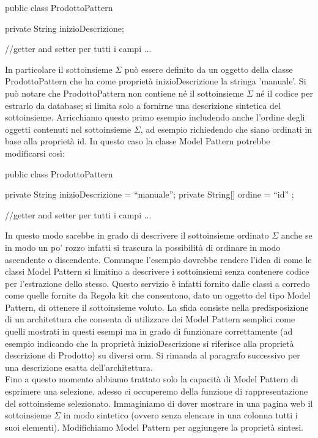 \begin{java}
public class ProdottoPattern  {
    
    private String inizioDescrizione;

    //getter and setter per tutti i campi
    ...
}
\end{java}

In particolare il sottoinsieme $\Sigma$ può essere definito da un oggetto della classe ProdottoPattern che ha come proprietà inizioDescrizione la stringa 'manuale'. Si può notare che ProdottoPattern non contiene né il sottoinsieme $\Sigma$ né il codice per estrarlo da database; si limita solo a fornirne una descrizione sintetica del sottoinsieme.
Arricchiamo questo primo esempio includendo anche l'ordine degli oggetti contenuti nel sottoinsieme $\Sigma$, ad esempio richiedendo che siano ordinati in base alla proprietà id. In questo caso la classe Model Pattern potrebbe modificarsi così:

\begin{java}
public class ProdottoPattern  {
    
    private String inizioDescrizione = ``manuale'';
    private String[] ordine = { ``id'' }; 

    //getter and setter per tutti i campi
    ...
}
\end{java}

In questo modo sarebbe in grado di descrivere il sottoinsieme ordinato $\Sigma$ anche se in modo un po' rozzo infatti si trascura la possibilità di ordinare in modo ascendente o discendente. Comunque l'esempio dovrebbe rendere l'idea di come le classi Model Pattern si limitino a descrivere i sottoinsiemi senza contenere codice per l'estrazione dello stesso. Questo servizio è infatti fornito dalle classi a corredo come quelle fornite da Regola kit che consentono, dato un oggetto del tipo Model Pattern, di ottenere il sottoinsieme voluto. La sfida consiste nella predisposizione di un architettura che consenta di utilizzare dei Model Pattern semplici come quelli mostrati in questi esempi ma in grado di funzionare correttamente (ad esempio indicando che la proprietà inizioDescrizione si riferisce alla proprietà descrizione di Prodotto) su diversi orm. Si rimanda al paragrafo successivo per una descrizione esatta dell'architettura.\\
Fino a questo momento abbiamo trattato solo la capacità di Model Pattern di esprimere una selezione, adesso ci occuperemo della funzione di rappresentazione del sottoinsieme selezionato. Immaginiamo di dover mostrare in una pagina web il sottoinsieme $\Sigma$ in modo sintetico (ovvero senza elencare in una colonna tutti i suoi elementi). Modifichiamo Model Pattern per aggiungere la proprietà sintesi.

